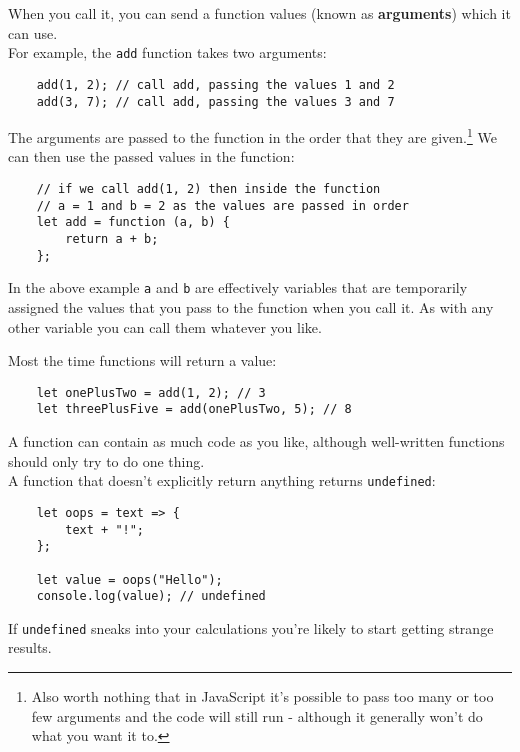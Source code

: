 When you call it, you can send a function values (known as \textbf{arguments}) which it can use.
\\

For example, the \texttt{add} function takes two arguments:

\begin{verbatim}
    add(1, 2); // call add, passing the values 1 and 2
    add(3, 7); // call add, passing the values 3 and 7
\end{verbatim}

The arguments are passed to the function in the order that they are given.\footnote{Also worth nothing that in JavaScript it's possible to pass too many or too few arguments and the code will still run - although it generally won't do what you want it to.} We can then use the passed values in the function:

\begin{verbatim}
    // if we call add(1, 2) then inside the function
    // a = 1 and b = 2 as the values are passed in order
    let add = function (a, b) {
        return a + b;
    };
\end{verbatim}

In the above example \texttt{a} and \texttt{b} are effectively variables that are temporarily assigned the values that you pass to the function when you call it. As with any other variable you can call them whatever you like.

\pagebreak

Most the time functions will return a value:

\begin{verbatim}
    let onePlusTwo = add(1, 2); // 3
    let threePlusFive = add(onePlusTwo, 5); // 8
\end{verbatim}

A function can contain as much code as you like, although well-written functions should only try to do one thing.
\\

A function that doesn't explicitly return anything returns \texttt{undefined}:

\begin{verbatim}
    let oops = text => {
        text + "!";
    };

    let value = oops("Hello");
    console.log(value); // undefined
\end{verbatim}

If \texttt{undefined} sneaks into your calculations you're likely to start getting strange results.


